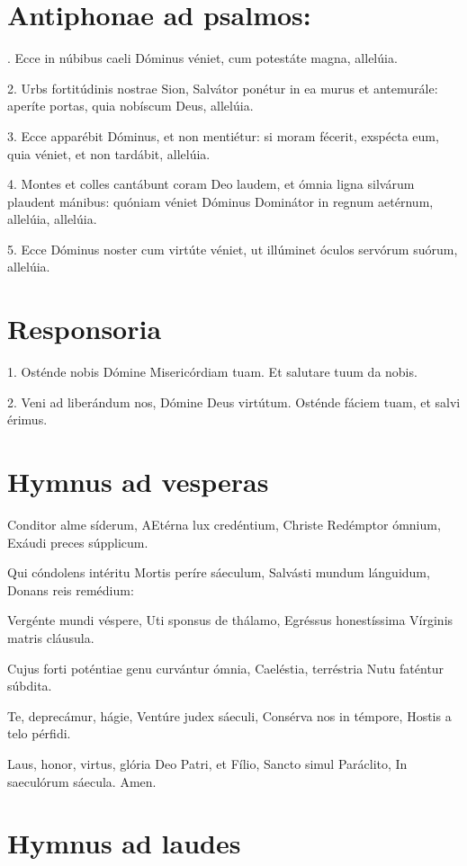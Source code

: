 \documentclass[a4paper, twoside, 12pt]{article}
\begin{document}
\section{Antiphonae ad psalmos:}

. Ecce in núbibus caeli Dóminus véniet,
cum potestáte magna, allelúia.

2. Urbs fortitúdinis nostrae Sion,
Salvátor ponétur in ea murus et antemurále:
aperíte portas,
quia nobíscum Deus, allelúia.

3. Ecce apparébit Dóminus,
et non mentiétur:
si moram fécerit, exspécta eum, 
quia véniet, et non tardábit, allelúia.

4. Montes et colles cantábunt coram Deo laudem,
et ómnia ligna silvárum plaudent mánibus:
quóniam véniet Dóminus Dominátor in regnum aetérnum, allelúia, allelúia.

5. Ecce Dóminus noster cum virtúte véniet,
ut illúminet óculos servórum suórum, allelúia.

\section{Responsoria}

1. Osténde nobis Dómine Misericórdiam tuam.
Et salutare tuum da nobis.

2. Veni ad liberándum nos, Dómine Deus virtútum.
Osténde fáciem tuam, et salvi érimus.

\section{Hymnus ad vesperas}

Conditor alme síderum,
AEtérna lux credéntium,
Christe  Redémptor ómnium,
Exáudi preces súpplicum. 	

Qui cóndolens intéritu
Mortis períre sáeculum,
Salvásti mundum lánguidum,
Donans reis remédium: 	

Vergénte mundi véspere,
Uti sponsus de thálamo,
Egréssus honestíssima
Vírginis matris cláusula. 	

Cujus forti poténtiae
genu curvántur ómnia,
Caeléstia, terréstria
Nutu faténtur súbdita. 	

Te, deprecámur, hágie,
Ventúre judex sáeculi,
Consérva nos in témpore,
Hostis a telo pérfidi. 	

Laus, honor, virtus, glória
Deo Patri, et Fílio,
Sancto simul Paráclito,
In saeculórum sáecula. Amen.

\section{Hymnus ad laudes}
\end{document}
